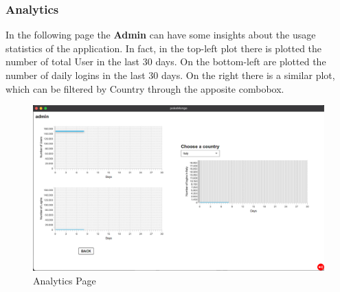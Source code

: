 \subsubsection{Analytics}
In the following page the \textbf{Admin} can have some insights about the usage statistics of the application. In fact, in the top-left plot there is plotted the number of total User in the last 30 days. On the bottom-left are plotted the number of daily logins in the last 30 days.
On the right there is a similar plot, which can be filtered by Country through the apposite combobox.
\begin{figure}[H]
	\centering
	\includegraphics[width=\textwidth]{img/userManual/usage_statistics.png}
	\caption{Analytics Page}
\end{figure}

